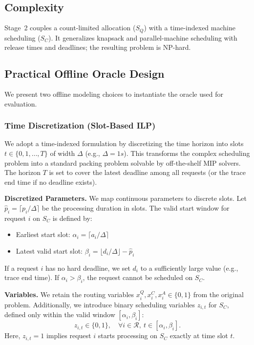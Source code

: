 \documentclass[11pt]{article}
\begin{document}
\subsection{Complexity}
Stage~2 couples a count-limited allocation (\(S_Q\)) with a time-indexed machine
scheduling (\(S_C\)). It generalizes knapsack and parallel-machine scheduling with
release times and deadlines; the resulting problem is NP-hard.

\subsection{Practical Offline Oracle Design}
We present two offline modeling choices to instantiate the oracle used for evaluation.

\subsubsection{Time Discretization (Slot-Based ILP)}
\label{sec:slot-ilp}

We adopt a time-indexed formulation by discretizing the time horizon into slots $t \in \{0, 1, \dots, T\}$ of width $\Delta$ (e.g., $\Delta=1s$). This transforms the complex scheduling problem into a standard packing problem solvable by off-the-shelf MIP solvers. The horizon $T$ is set to cover the latest deadline among all requests (or the trace end time if no deadline exists).

\textbf{Discretized Parameters.} We map continuous parameters to discrete slots. Let $\hat{p}_i = \lceil p_i/\Delta \rceil$ be the processing duration in slots. The valid start window for request $i$ on $S_C$ is defined by:
\begin{itemize}
    \item Earliest start slot: $\alpha_i = \lceil a_i/\Delta \rceil$
    \item Latest valid start slot: $\beta_i = \lfloor d_i/\Delta \rfloor - \hat{p}_i$
\end{itemize}
If a request $i$ has no hard deadline, we set $d_i$ to a sufficiently large value (e.g., trace end time). If $\alpha_i > \beta_i$, the request cannot be scheduled on $S_C$.

\textbf{Variables.} We retain the routing variables $x_i^Q, x_i^C, x_i^A \in \{0,1\}$ from the original problem. Additionally, we introduce binary scheduling variables $z_{i,t}$ for $S_C$, defined only within the valid window $[\alpha_i, \beta_i]$:
\begin{equation}
    z_{i,t} \in \{0, 1\}, \quad \forall i \in \mathcal{R}, \ t \in [\alpha_i, \beta_i].
\end{equation}
Here, $z_{i,t}=1$ implies request $i$ starts processing on $S_C$ exactly at time slot $t$.
\end{document}
